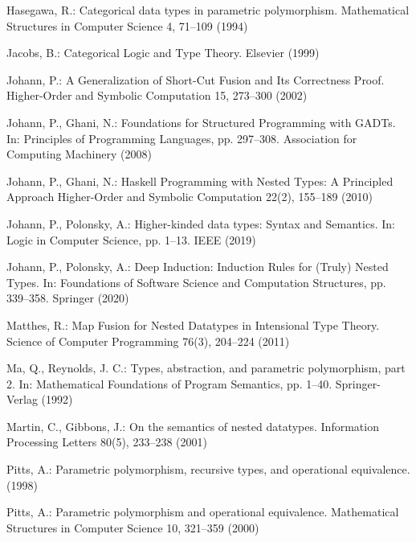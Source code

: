 \documentclass[runningheads]{llncs}
\begin{document}
\begin{thebibliography}{8}
 Hasegawa, R.: Categorical data types in parametric polymorphism. 
 Mathematical Structures in Computer Science  4,  71--109 (1994)

 Jacobs, B.: Categorical Logic and Type Theory. 
  Elsevier (1999)

 Johann, P.: A Generalization of Short-Cut Fusion and
  Its Correctness Proof.  Higher-Order and Symbolic Computation 15,
  273--300 (2002)


 Johann, P., Ghani, N.: Foundations for Structured
  Programming with GADTs.  In: Principles of Programming Languages,
  pp. 297--308. Association for Computing Machinery (2008)

 Johann, P., Ghani, N.: Haskell Programming with Nested
  Types: A Principled Approach Higher-Order and Symbolic Computation
  22(2), 155--189 (2010)

 Johann, P., Polonsky, A.: Higher-kinded data types:
  Syntax and Semantics. In: Logic in Computer Science, pp. 1--13. IEEE 
  (2019)

 Johann, P., Polonsky, A.: Deep Induction: Induction
  Rules for (Truly) Nested Types.  In: Foundations of Software Science
  and Computation Structures, pp. 339--358. Springer (2020)

 Matthes, R.: Map Fusion for Nested Datatypes in
  Intensional Type Theory. Science of Computer Programming 76(3),
  204--224 (2011)
    
 Ma, Q., Reynolds, J. C.: Types, abstraction, and
  parametric polymorphism, part 2.  In: Mathematical Foundations of
  Program Semantics, pp. 1--40. Springer-Verlag (1992)

 Martin, C., Gibbons, J.: On the semantics of nested
  datatypes.  Information Processing Letters 80(5), 233--238 (2001)


 Pitts, A.: Parametric polymorphism, recursive types,
  and operational equivalence.  (1998)

 Pitts, A.: Parametric polymorphism and operational equivalence.
  Mathematical Structures in Computer Science 10, 321--359 (2000)


\end{thebibliography}
\end{document}
